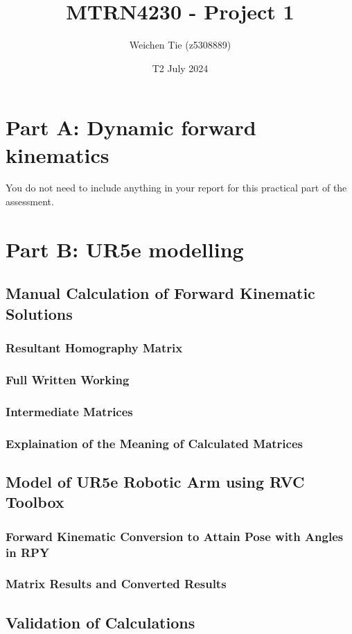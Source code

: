 \documentclass[12pt, a4paper]{article}
\title{MTRN4230 - Project 1}
\author{Weichen Tie (z5308889)}
\date{T2 July 2024}
\begin{document}
\maketitle
\tableofcontents
\section{Part A: Dynamic forward kinematics}
You do not need to include anything in your report for this practical part of the assessment.

\section{Part B: UR5e modelling}
\subsection{Manual Calculation of Forward Kinematic Solutions}
\subsubsection{Resultant Homography Matrix}
\subsubsection{Full Written Working}
\subsubsection{Intermediate Matrices}
\subsubsection{Explaination of the Meaning of Calculated Matrices}
\subsection{Model of UR5e Robotic Arm using RVC Toolbox}
\subsubsection{Forward Kinematic Conversion to Attain Pose with Angles in RPY}
\subsubsection{Matrix Results and Converted Results}
\subsection{Validation of Calculations}
\end{document}
